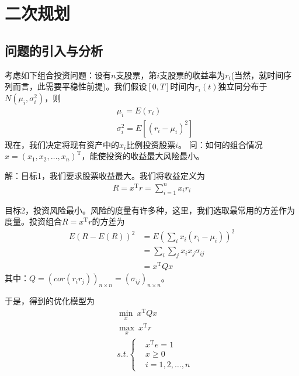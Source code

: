 
\chapter{二次规划}

\section{问题的引入与分析}
    \label{sec:二次规划引例}
    \par
    考虑如下组合投资问题：设有$n$支股票，第$i$支股票的收益率为$r_i$(当然，就时间序列而言，此需要平稳性前提)。我们假设$[0,T]$时间内$r_i(t)$独立同分布于$N({\mu}_i,{\sigma}_i^2)$，则
    \begin{align*}
    &{\mu}_i = E(r_i)\\
    &{\sigma}_i^2=E[(r_i-{\mu}_i)^2]
    \end{align*}
    现在，我们决定将现有资产中的$x_i$比例投资股票$i$。
    问：如何的组合情况$x=(x_1,x_2,\ldots,x_n)^\mathrm{T} $，能使投资的收益最大风险最小。
    \par
    解：目标1，我们要求股票收益最大。我们将收益定义为
    \begin{align*}
    R=x^\mathrm{T} r=\mathop{\sum}\limits_{i=1}^n x_ir_i
    \end{align*}
    \par
    目标2，投资风险最小。风险的度量有许多种，这里，我们选取最常用的方差作为度量。投资组合$R=x^\mathrm{T} r$的方差为
    \begin{align*}
    E(R-E(R))^2&=E \left( \mathop{\sum}\limits_{i} x_i(r_i-{\mu}_i) \right) ^2\\
    &=\mathop{\sum}\limits_{i}\mathop{\sum}\limits_{j}x_ix_j{\sigma}_{ij}\\
    &=x^\mathrm{T} Qx
    \end{align*}
    其中：${Q}=(cor(r_ir_j))_{n\times n}=(\sigma_{ij})_{n\times n}$。
    \par
    于是，得到的优化模型为
    \begin{align*}
    &\mathop {\min}\limits_x\  x^\mathrm{T} Qx\\
    &\mathop {\max}\limits_x\  x^\mathrm{T} r\\
    &s.t.\left\{
    \begin{aligned}
    &x^\mathrm{T} e=1\\
    &x \geqslant 0\\
    &i=1,2,\ldots,n
    \end{aligned}
    \right.
    \end{align*}
